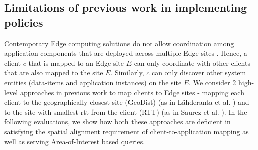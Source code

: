 \subsection{Limitations of previous work in implementing policies}
\label{sec:spatial_ctx_prev_work}
Contemporary Edge computing solutions do not allow coordination among application components that are deployed across multiple Edge sites \cite{gabriel, azure_iot_edge}. Hence, a client $c$ that is mapped to an Edge site $E$ can only coordinate with other clients that are also mapped to the site $E$. Similarly, $c$ can only discover other system entities (data-items and application instances) on the site $E$. We consider 2 high-level approaches in previous work to map clients to Edge sites - mapping each client to the geographically closest site (GeoDist) (as in L{\"a}hderanta et al. \cite{lahderanta2021edge}) and to the site with smallest \gls{rtt} from the client (RTT) (as in Saurez et al. \cite{foglets}). In the following evaluations, we show how both these approaches are deficient in satisfying the spatial alignment requirement of client-to-application mapping as well as serving Area-of-Interest based queries.

